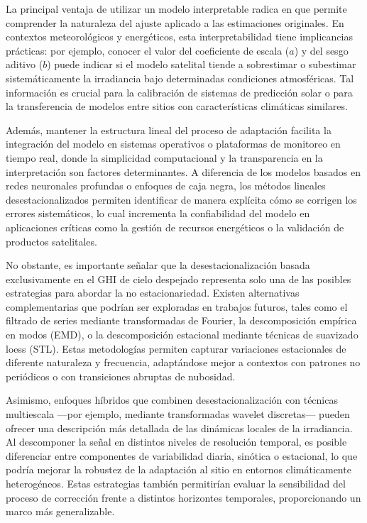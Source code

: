 \documentclass[letterpaper,12pt, twoside]{report}
\providecommand{\DIFdeltex}[1]{{\protect\color{red} \scriptsize #1}} %
\providecommand{\DIFdel}[1]{\texorpdfstring{\DIFdeltex{#1}}{}} %
\begin{document}
\DIFdel{La principal ventaja de utilizar un modelo interpretable radica en que permite comprender la naturaleza del ajuste aplicado a las estimaciones originales. En contextos meteorológicos y energéticos, esta interpretabilidad tiene implicancias prácticas: por ejemplo, conocer el valor del coeficiente de escala ($a$) y del sesgo aditivo ($b$) puede indicar si el modelo satelital tiende a sobrestimar o subestimar sistemáticamente la irradiancia bajo determinadas condiciones atmosféricas. Tal información es crucial para la calibración de sistemas de predicción solar o para la transferencia de modelos entre sitios con características climáticas similares.
}%

\DIFdel{Además, mantener la estructura lineal del proceso de adaptación facilita la integración del modelo en sistemas operativos o plataformas de monitoreo en tiempo real, donde la simplicidad computacional y la transparencia en la interpretación son factores determinantes. A diferencia de los modelos basados en redes neuronales profundas o enfoques de caja negra, los métodos lineales desestacionalizados permiten identificar de manera explícita cómo se corrigen los errores sistemáticos, lo cual incrementa la confiabilidad del modelo en aplicaciones críticas como la gestión de recursos energéticos o la validación de productos satelitales.
}%

\DIFdel{No obstante, es importante señalar que la desestacionalización basada exclusivamente en el GHI de cielo despejado representa solo una de las posibles estrategias para abordar la no estacionariedad. Existen alternativas complementarias que podrían ser exploradas en trabajos futuros, tales como el filtrado de series mediante transformadas de Fourier, la descomposición empírica en modos (EMD), o la descomposición estacional mediante técnicas de suavizado loess (STL). Estas metodologías permiten capturar variaciones estacionales de diferente naturaleza y frecuencia, adaptándose mejor a contextos con patrones no periódicos o con transiciones abruptas de nubosidad.
}%

\DIFdel{Asimismo, enfoques híbridos que combinen desestacionalización con técnicas multiescala —por ejemplo, mediante transformadas wavelet discretas— pueden ofrecer una descripción más detallada de las dinámicas locales de la irradiancia. Al descomponer la señal en distintos niveles de resolución temporal, es posible diferenciar entre componentes de variabilidad diaria, sinótica o estacional, lo que podría mejorar la robustez de la adaptación al sitio en entornos climáticamente heterogéneos. Estas estrategias también permitirían evaluar la sensibilidad del proceso de corrección frente a distintos horizontes temporales, proporcionando un marco más generalizable.
}%
\end{document}
